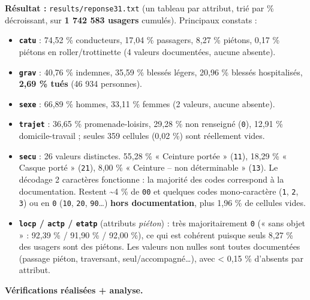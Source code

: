 \documentclass[11pt,a4paper]{article}
\newcommand{\rub}[2]{\textbf{\textcolor{#1}{#2}}}
\begin{document}
\rub{labresultat}{Résultat :} \texttt{results/reponse31.txt} (un tableau par attribut, trié par \% décroissant, sur \textbf{1 742 583 usagers} cumulés). Principaux constats :

\begin{itemize}
\item \textbf{\texttt{catu}} : 74,52 \% conducteurs, 17,04 \% passagers, 8,27 \% piétons, 0,17 \% piétons en roller/trottinette (4 valeurs documentées, aucune absente).
\item \textbf{\texttt{grav}} : 40,76 \% indemnes, 35,59 \% blessés légers, 20,96 \% blessés hospitalisés, \textbf{2,69 \% tués} (46 934 personnes).
\item \textbf{\texttt{sexe}} : 66,89 \% hommes, 33,11 \% femmes (2 valeurs, aucune absente).
\item \textbf{\texttt{trajet}} : 36,65 \% promenade-loisirs, 29,28 \% non renseigné (\texttt{0}), 12,91 \% domicile-travail ; seules 359 cellules (0,02 \%) sont réellement vides.
\item \textbf{\texttt{secu}} : 26 valeurs distinctes. 55,28 \% « Ceinture portée » (\texttt{11}), 18,29 \% « Casque porté » (\texttt{21}), 8,00 \% « Ceinture – non déterminable » (\texttt{13}). Le décodage 2 caractères fonctionne : la majorité des codes correspond à la documentation. Restent \textasciitilde{}4 \% de \texttt{00} et quelques codes mono-caractère (\texttt{1}, \texttt{2}, \texttt{3}) ou en \texttt{0} (\texttt{10}, \texttt{20}, \texttt{90}…) \textbf{hors documentation}, plus 1,96 \% de cellules vides.
\item \textbf{\texttt{locp} / \texttt{actp} / \texttt{etatp}} (attributs \emph{piéton}) : très majoritairement \texttt{0} (« sans objet » : 92,39 \% / 91,90 \% / 92,00 \%), ce qui est cohérent puisque seuls 8,27 \% des usagers sont des piétons. Les valeurs non nulles sont toutes documentées (passage piéton, traversant, seul/accompagné…), avec < 0,15 \% d'absents par attribut.
\end{itemize}

\rub{labanalyse}{Vérifications réalisées + analyse.}
\end{document}
